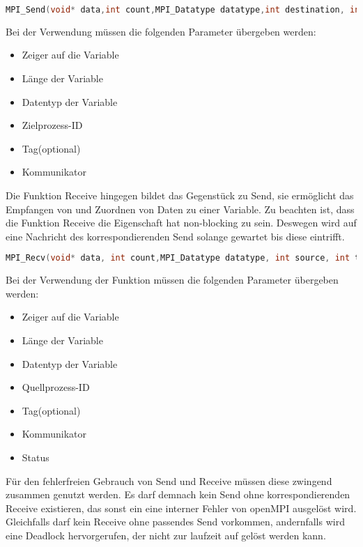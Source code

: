 \begin{lstlisting}[language=C]
MPI_Send(void* data,int count,MPI_Datatype datatype,int destination, int tag, MPI_Comm communicator)
\end{lstlisting}

Bei der Verwendung müssen die folgenden Parameter übergeben werden:

\begin{itemize}
\item Zeiger auf die Variable
\item Länge der Variable
\item Datentyp der Variable
\item Zielprozess-ID
\item Tag(optional)
\item Kommunikator
\end{itemize}

Die Funktion Receive hingegen bildet das Gegenstück zu Send, sie ermöglicht das Empfangen von  und Zuordnen von Daten zu einer Variable. Zu beachten ist, dass die Funktion Receive die Eigenschaft hat non-blocking zu sein. Deswegen wird auf eine Nachricht des korrespondierenden  Send solange gewartet bis diese eintrifft.

\begin{lstlisting}[language=C]
MPI_Recv(void* data, int count,MPI_Datatype datatype, int source, int tag, MPI_Comm communicator,MPI_Status* status)
\end{lstlisting}

Bei der Verwendung der Funktion müssen die folgenden Parameter übergeben werden:

\begin{itemize}
\item Zeiger auf die Variable
\item Länge der Variable
\item Datentyp der Variable
\item Quellprozess-ID
\item Tag(optional)
\item Kommunikator
\item Status
\end{itemize}

Für den fehlerfreien Gebrauch von Send und Receive müssen diese zwingend zusammen genutzt werden. Es darf demnach kein Send ohne korrespondierenden Receive existieren, das sonst ein eine interner Fehler von openMPI ausgelöst wird. Gleichfalls darf kein Receive ohne passendes Send vorkommen, andernfalls wird eine Deadlock hervorgerufen, der nicht zur laufzeit auf gelöst werden  kann.


